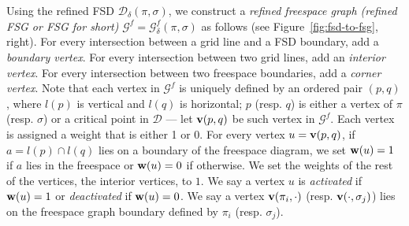 \documentclass[thm-restate]{lipics-v2021}
\theoremstyle{remark}
\newcommand{\weight}[1]{\normalfont \textbf{w}(#1)}
\newcommand{\graph}[0]{\mathcal{G}}
\newcommand{\fd}[2]{\mathcal{D}_{#2}(#1)}
\newcommand{\D}{\mathcal{D}}
\newcommand{\vertex}[1]{\normalfont \textbf{v}(#1)}
\newcommand{\fsgraph}[0]{\graph^{f}}
\begin{document}
Using the refined FSD $\fd{\pi, \sigma}{\delta}$, we construct a \emph{refined freespace graph (refined FSG or FSG for short)} $\fsgraph = \fsgraph_\delta(\pi, \sigma)$ as follows (see Figure~\ref{fig:fsd-to-fsg}, right). For every intersection between a grid line and a FSD boundary, add a \emph{boundary vertex}. For every intersection between two grid lines, add an \emph{interior vertex}. For every intersection between two freespace boundaries, add a \emph{corner vertex}. Note that each vertex in $\fsgraph$ is uniquely defined by an ordered pair $(p, q)$, where $l(p)$ is vertical and $l(q)$ is horizontal; $p$ (resp. $q$) is either a vertex of $\pi$ (resp. $\sigma$) or a critical point in $\D$ --- let $\vertex{p, q}$ be such vertex in $\fsgraph$. Each vertex is assigned a weight that is either 1 or 0. For every vertex $u = \vertex{p, q}$, if $a = l(p) \cap l(q)$ lies on a boundary of the freespace diagram, we set $\weight{u} = 1$ if $a$ lies in the freespace or $\weight{u} = 0$ if otherwise. We set the weights of the rest of the vertices, the interior vertices, to $1$. We say a vertex $u$ is \emph{activated} if $\weight{u} = 1$ or \emph{deactivated} if $\weight{u} = 0$. We say a vertex $\vertex{\pi_i, \cdot}$ (resp. $\vertex{\cdot, \sigma_j}$) lies on the freespace graph boundary defined by $\pi_i$ (resp. $\sigma_j$). 
\end{document}
